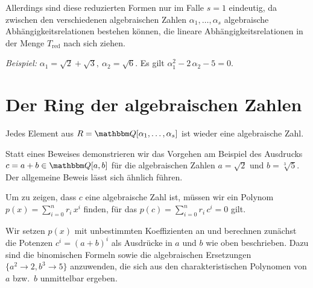 \documentclass[11pt,a4paper]{article}
\newcommand{\red}{\mathrm{red}}
\begin{document}
Allerdings sind diese reduzierten Formen nur im Falle $s=1$ eindeutig, da
zwischen den verschiedenen algebraischen Zahlen $\alpha_1,\ldots,\alpha_s$
algebraische Abhängigkeitsrelationen bestehen können, die lineare
Abhängigkeitsrelationen in der Menge $T_{\red}$ nach sich ziehen.

\emph{Beispiel:} $\alpha_1=\sqrt{2}+\sqrt{3},\ \alpha_2=\sqrt{6}$. Es gilt
$\alpha_1^2-2\,\alpha_2-5=0$.

\section{Der Ring der algebraischen Zahlen}

\begin{satz}
  Jedes Element aus $R= \Q[\alpha_1,\ldots,\alpha_s]$ ist wieder eine
  algebraische Zahl. 
\end{satz}

Statt eines Beweises demonstrieren wir das Vorgehen am Beispiel des Ausdrucks
$c=a+b\in\Q[a,b]$ für die algebraischen Zahlen $a=\sqrt{2}$ und
$b=\sqrt[3]{5}$.  Der allgemeine Beweis lässt sich ähnlich führen. 

Um zu zeigen, dass $c$ eine algebraische Zahl ist, müssen wir ein Polynom
$p(x)=\sum_{i=0}^n{r_i\,x^i}$ finden, für das $p(c)=\sum_{i=0}^n{r_i\,c^i}=0$
gilt.  

Wir setzen $p(x)$ mit unbestimmten Koeffizienten an und berechnen zunächst die
Potenzen $c^i=(a+b)^i$ als Ausdrücke in $a$ und $b$ wie oben beschrieben. Dazu
sind die binomischen Formeln sowie die algebraischen Ersetzungen $\{a^2\to 2,
b^3\to 5\}$ anzuwenden, die sich aus den charakteristischen Polynomen von $a$
bzw.\ $b$ unmittelbar ergeben. 
\end{document}
